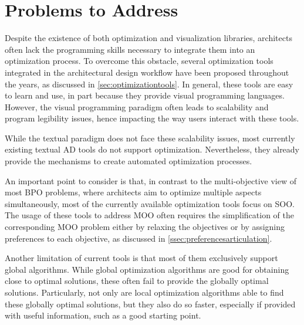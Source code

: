 	\section{Problems to Address}
	\label{sec:problemsaddress}
	
	Despite the existence of both optimization and visualization libraries, architects often lack the programming skills necessary to integrate them into an optimization process. To overcome this obstacle, 
	several optimization tools integrated in the architectural design workflow have been proposed throughout the years, as discussed in \cref{sec:optimizationtools}. In general, these tools are easy to learn and use, in part because they provide  visual programming languages. However, the visual programming paradigm often leads to scalability and program legibility issues, hence impacting the way users interact with these tools. 
	
	While the textual paradigm does not face these scalability issues, most currently existing textual \ac{AD} tools do not support optimization. Nevertheless, they already provide the mechanisms to create automated optimization processes.
	
	An important point to consider is that, in contrast to the multi-objective view of most \ac{BPO} problems, where architects aim to optimize multiple aspects simultaneously, most of the currently available optimization tools focus on \ac{SOO}. The usage of these tools to address \ac{MOO} often requires the simplification of the corresponding \ac{MOO} problem either by relaxing the objectives or by assigning preferences to each objective, as discussed in \cref{ssec:preferencesarticulation}.
	
	Another limitation of current tools is that most of them exclusively support global algorithms. While global optimization algorithms are good for obtaining close to optimal solutions, these often fail to provide the globally optimal solutions. Particularly, not only are local optimization algorithms able to find these globally optimal solutions, but they also do so faster, especially if provided with useful information, such as a good starting point.
	
	
